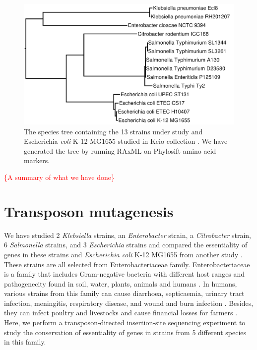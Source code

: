 \documentclass[12pt,letterpaper]{article}
\begin{document}
\begin{figure}
\includegraphics[scale=0.2]{phylosift-aa-raxmlbootstrap.pdf}
\caption{The species tree containing the 13 strains under study and Escherichia \textit{coli} K-12 MG1655 studied in Keio collection \cite{baba_construction_2006}. We have generated the tree by running RAxML \cite{stamatakis_raxml_2014} on Phylosift \cite{darling_phylosift:_2014} amino acid markers.}
\label{fig:species-tree}
\end{figure}

\textcolor{red}{\{A summary of what we have done\}}

\section{Transposon mutagenesis}
We have studied 2 \textit{Klebsiella} strains, an \textit{Enterobacter} strain, a \textit{Citrobacter} strain, 6 \textit{Salmonella} strains, and 3 \textit{Escherichia} strains and compared the essentiality of genes in these strains and \textit{Escherichia coli} K-12 MG1655 from another study \cite{baba_construction_2006}. These strains are all selected from Enterobacteriaceae family. Enterobacteriaceae is a family that includes Gram-negative bacteria with different host ranges and pathogenecity found in soil, water, plants, animals and humans \cite{brenner_bergeys_2006}. In humans, various strains from this family can cause diarrhoea, septicaemia, urinary tract infection, meningitis, respiratory disease, and wound and burn infection \cite{brenner_bergeys_2006}. Besides, they can infect poultry and livestocks and cause financial losses for farmers \cite{brenner_bergeys_2006}. Here, we perform a transposon-directed insertion-site sequencing experiment to study the conservation of essentiality of genes in strains from 5 different species in this family.
\end{document}
